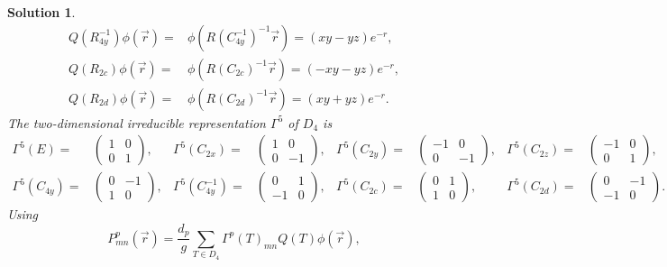 \documentclass[UTF8,10pt,a4paper]{article}
\theoremstyle{Problem}
\theoremstyle{Solution}
\newtheorem*{sol}{Solution}
\begin{document}
\begin{sol}
\begin{align}
        Q(R_{4y}^{-1})\phi(\vec{r})=&\phi(R(C_{4y}^{-1})^{-1}\vec{r})=(xy-yz)e^{-r},\\
        Q(R_{2c})\phi(\vec{r})=&\phi(R(C_{2c})^{-1}\vec{r})=(-xy-yz)e^{-r},\\
        Q(R_{2d})\phi(\vec{r})=&\phi(R(C_{2d})^{-1}\vec{r})=(xy+yz)e^{-r}.
    \end{align}
    The two-dimensional irreducible representation $\Gamma^5$ of $D_4$ is
    \begin{align}
        \Gamma^5(E)=&\left(\begin{matrix}
            1&0\\
            0&1
        \end{matrix}\right),&\Gamma^5(C_{2x})=&\left(\begin{matrix}
            1&0\\
            0&-1
        \end{matrix}\right),&\Gamma^5(C_{2y})=&\left(\begin{matrix}
            -1&0\\
            0&-1
        \end{matrix}\right),&\Gamma^5(C_{2z})=&\left(\begin{matrix}
            -1&0\\
            0&1
        \end{matrix}\right),\\
        \Gamma^5(C_{4y})=&\left(\begin{matrix}
            0&-1\\
            1&0
        \end{matrix}\right),&\Gamma^5(C_{4y}^{-1})=&\left(\begin{matrix}
            0&1\\
            -1&0
        \end{matrix}\right),&\Gamma^5(C_{2c})=&\left(\begin{matrix}
            0&1\\
            1&0
        \end{matrix}\right),&\Gamma^5(C_{2d})=&\left(\begin{matrix}
            0&-1\\
            -1&0
        \end{matrix}\right).
    \end{align}
    Using
    \begin{equation}
        P_{mn}^p(\vec{r})=\frac{d_p}{g}\sum_{T\in D_4}\Gamma^p(T)_{mn}Q(T)\phi(\vec{r}),
    \end{equation}

\end{sol}
\end{document}
